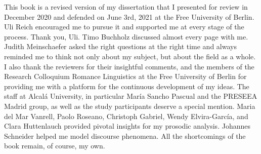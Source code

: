 \addchap{\lsAcknowledgementTitle} 

This book is a revised version of my dissertation that I presented for review in December 2020 and defended on June 3rd, 2021 at the Free University of Berlin. Uli Reich encouraged me to pursue it and supported me at every stage of the process. Thank you, Uli. Timo Buchholz discussed almost every page with me. Judith Meinschaefer asked the right questions at the right time and always reminded me to think not only about my subject, but about the field as a whole. I also thank the reviewers for their insightful comments, and the members of the Research Colloquium Romance Linguistics at the Free University of Berlin for providing me with a platform for the continuous development of my ideas. The staff at Alcalá University, in particular María Sancho Pascual and the PRESEEA Madrid group, as well as the study participants deserve a special mention. Maria del Mar Vanrell, Paolo Roseano, Christoph Gabriel, Wendy Elvira-García, and Clara Huttenlauch provided pivotal insights for my prosodic analysis. Johannes Schneider helped me model discourse phenomena. All the shortcomings of the book remain, of course, my own.
